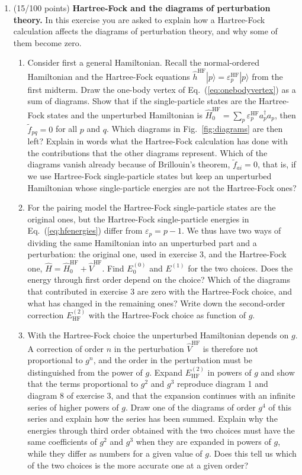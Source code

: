 \documentclass[prc]{revtex4}
\begin{document}
\begin{enumerate}
\item (15/100 points) \textbf{Hartree-Fock and the diagrams of perturbation theory.}
In this exercise you are asked to explain how a Hartree-Fock
calculation affects the diagrams of perturbation theory, and why some
of them become zero.
\begin{enumerate}
\item Consider first a general Hamiltonian. Recall the normal-ordered
  Hamiltonian and the Hartree-Fock equations
  $\hat{h}^{\mathrm{HF}}|p\rangle=\varepsilon^{\mathrm{HF}}_p|p\rangle$
  from the first midterm. Draw the one-body vertex of
  Eq.~(\ref{eq:onebodyvertex}) as a sum of diagrams. Show that if the
  single-particle states are the Hartree-Fock states and the
  unperturbed Hamiltonian is
  $\hat{H}_0^{\mathrm{HF}}=\sum_p\varepsilon_p^{\mathrm{HF}}a^\dagger_pa_p$,
  then $\tilde{f}_{pq}=0$ for all $p$ and $q$. Which diagrams in
  Fig.~\ref{fig:diagrams} are then left? Explain in words what the
  Hartree-Fock calculation has done with the contributions that the
  other diagrams represent. Which of the diagrams vanish already
  because of Brillouin's theorem, $\tilde{f}_{ai}=0$, that is, if we
  use Hartree-Fock single-particle states but keep an unperturbed
  Hamiltonian whose single-particle energies are not the Hartree-Fock
  ones?
\item For the pairing model the Hartree-Fock single-particle states
  are the original ones, but the Hartree-Fock single-particle energies
  in Eq.~(\ref{eq:hfenergies}) differ from $\varepsilon_p=p-1$. We
  thus have two ways of dividing the same Hamiltonian into an
  unperturbed part and a perturbation: the original one, used in
  exercise 3, and the Hartree-Fock one,
  $\hat{H}=\hat{H}_0^{\mathrm{HF}}+\hat{V}^{\mathrm{HF}}$. Find
  $E^{(0)}_0$ and $E^{(1)}$ for the two choices. Does the energy
  through first order depend on the choice? Which of the diagrams that
  contributed in exercise 3 are zero with the Hartree-Fock choice, and
  what has changed in the remaining ones? Write down the second-order
  correction $E^{(2)}_{\mathrm{HF}}$ with the Hartree-Fock choice as
  function of $g$.
\item With the Hartree-Fock choice the unperturbed Hamiltonian depends
  on $g$. A correction of order $n$ in the perturbation
  $\hat{V}^{\mathrm{HF}}$ is therefore not proportional to $g^n$, and
  the order in the perturbation must be distinguished from the power
  of $g$. Expand $E^{(2)}_{\mathrm{HF}}$ in powers of $g$ and show that
  the terms proportional to $g^2$ and $g^3$ reproduce diagram 1 and
  diagram 8 of exercise 3, and that the expansion continues with an
  infinite series of higher powers of $g$. Draw one of the diagrams
  of order $g^4$ of this series and explain how the series has been
  summed. Explain why the energies through third order obtained with
  the two choices must have the same coefficients of $g^2$ and $g^3$
  when they are expanded in powers of $g$, while they differ as
  numbers for a given value of $g$. Does this tell us which of the two
  choices is the more accurate one at a given order?
\end{enumerate}

\end{enumerate}
\end{document}
